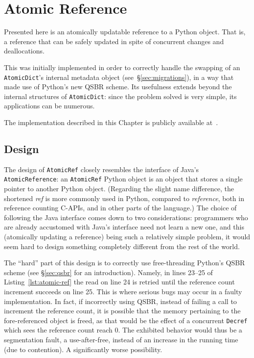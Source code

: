 \chapter{Atomic Reference}\label{ch:atomic-reference}

Presented here is an atomically updatable reference to a Python object.
That is, a reference that can be safely updated in spite of concurrent changes and deallocations.

This was initially implemented in order to correctly handle the swapping of an \texttt{AtomicDict}'s internal metadata object (see~\S\ref{sec:migrations}), in a way that made use of Python's new QSBR scheme.
Its usefulness extends beyond the internal structures of \texttt{AtomicDict}: since the problem solved is very simple, its applications can be numerous.

The implementation described in this Chapter is publicly available at~\cite[src/cereggii/atomic\_ref.c]{cereggii}.


\section{Design}\label{sec:design}

The design of \texttt{AtomicRef} closely resembles the interface of Java's \texttt{AtomicReference}: an \texttt{AtomicRef} Python object is an object that stores a single pointer to another Python object.
(Regarding the slight name difference, the shortened \emph{ref} is more commonly used in Python, compared to \emph{reference}, both in reference counting C-APIs, and in other parts of the language.)
The choice of following the Java interface comes down to two considerations: programmers who are already accustomed with Java's interface need not learn a new one, and this (atomically updating a reference) being such a relatively simple problem, it would seem hard to design something completely different from the rest of the world.

The ``hard'' part of this design is to correctly use free-threading Python's QSBR scheme (see \S\ref{sec:qsbr} for an introduction).
Namely, in lines 23--25 of Listing~\ref{lst:atomic-ref} the read on line 24 is retried until the reference count increment succeeds on line 25.
This is where serious bugs may occur in a faulty implementation.
In fact, if incorrectly using QSBR, instead of failing a call to increment the reference count, it is possible that the memory pertaining to the fore-referenced object is freed, as that would be the effect of a concurrent \texttt{Decref} which sees the reference count reach 0.
The exhibited behavior would thus be a segmentation fault, a use-after-free, instead of an increase in the running time (due to contention).
A significantly worse possibility.

